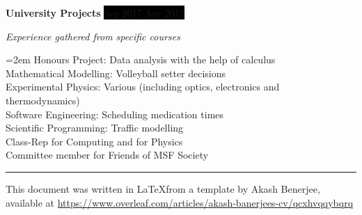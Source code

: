 \documentclass[paper=a4,fontsize=11pt]{scrartcl} %
\newlength{\spacebox}
\newcommand{\sepspace}{\vspace*{1em}}		%
\newcommand{\NewPart}[1]{\section*{\uppercase{#1}}}
\newcommand{\PersonalEntry}[2]{
		\noindent\hangindent=2em\hangafter=0 %
		\parbox{\spacebox}{        %
		\textit{#1}}		       %
		\hspace{1.5em} #2 \par}    %
\newcommand{\SkillsEntry}[2]{      %
		\noindent\hangindent=2em\hangafter=0 %
		\parbox{\spacebox}{        %
		\textit{#1}}			   %
		\hspace{1.5em} \parbox{6\spacebox}{#2} \par}    %
\newcommand{\EducationEntry}[4]{
		\noindent \textbf{#1} \hfill      %
		\colorbox{Black}{%
			\parbox{6em}{%
			\hfill\color{White}#2}} \par  %
		\noindent \textit{#3} \par        %
		\noindent\hangindent=2em\hangafter=0 \small #4 %
		\normalsize \par}
\newcommand{\WorkEntry}[4]{				  %
		\noindent \textbf{#1} \hfill      %
		\colorbox{Black}{\color{White}#2} \par  %
		\noindent \textit{#3} \par              %
		\noindent\hangindent=2em\hangafter=0 \small #4 %
		\normalsize \par}
\begin{document}
\WorkEntry{University Projects}{Sep 2017-Apr 2019}{Experience gathered from
specific courses}{Honours Project: Data analysis with the help of calculus \\
Mathematical Modelling: Volleyball setter decisions \\Experimental Physics:
Various (including optics, electronics and thermodynamics) \\ Software
Engineering: Scheduling medication times \\  Scientific Programming: Traffic
modelling \\ Class-Rep for Computing and for Physics \\ Committee member for
Friends of MSF Society}



%


\vfill
\small
\centering
\rule{\linewidth}{0.4pt}
This document was written in \LaTeX from a template by Akash Benerjee, available at \url{https://www.overleaf.com/articles/akash-banerjees-cv/qcxhvqqybqrq}


% 
\end{document}
